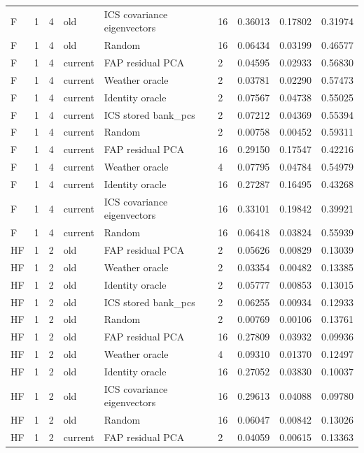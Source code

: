 \begin{tabular}{lllllllll}
F & 1 & 4 & old & ICS covariance eigenvectors & 16 & 0.36013 & 0.17802 & 0.31974 \\
F & 1 & 4 & old & Random & 16 & 0.06434 & 0.03199 & 0.46577 \\
F & 1 & 4 & current & FAP residual PCA & 2 & 0.04595 & 0.02933 & 0.56830 \\
F & 1 & 4 & current & Weather oracle & 2 & 0.03781 & 0.02290 & 0.57473 \\
F & 1 & 4 & current & Identity oracle & 2 & 0.07567 & 0.04738 & 0.55025 \\
F & 1 & 4 & current & ICS stored bank\_pcs & 2 & 0.07212 & 0.04369 & 0.55394 \\
F & 1 & 4 & current & Random & 2 & 0.00758 & 0.00452 & 0.59311 \\
F & 1 & 4 & current & FAP residual PCA & 16 & 0.29150 & 0.17547 & 0.42216 \\
F & 1 & 4 & current & Weather oracle & 4 & 0.07795 & 0.04784 & 0.54979 \\
F & 1 & 4 & current & Identity oracle & 16 & 0.27287 & 0.16495 & 0.43268 \\
F & 1 & 4 & current & ICS covariance eigenvectors & 16 & 0.33101 & 0.19842 & 0.39921 \\
F & 1 & 4 & current & Random & 16 & 0.06418 & 0.03824 & 0.55939 \\
HF & 1 & 2 & old & FAP residual PCA & 2 & 0.05626 & 0.00829 & 0.13039 \\
HF & 1 & 2 & old & Weather oracle & 2 & 0.03354 & 0.00482 & 0.13385 \\
HF & 1 & 2 & old & Identity oracle & 2 & 0.05777 & 0.00853 & 0.13015 \\
HF & 1 & 2 & old & ICS stored bank\_pcs & 2 & 0.06255 & 0.00934 & 0.12933 \\
HF & 1 & 2 & old & Random & 2 & 0.00769 & 0.00106 & 0.13761 \\
HF & 1 & 2 & old & FAP residual PCA & 16 & 0.27809 & 0.03932 & 0.09936 \\
HF & 1 & 2 & old & Weather oracle & 4 & 0.09310 & 0.01370 & 0.12497 \\
HF & 1 & 2 & old & Identity oracle & 16 & 0.27052 & 0.03830 & 0.10037 \\
HF & 1 & 2 & old & ICS covariance eigenvectors & 16 & 0.29613 & 0.04088 & 0.09780 \\
HF & 1 & 2 & old & Random & 16 & 0.06047 & 0.00842 & 0.13026 \\
HF & 1 & 2 & current & FAP residual PCA & 2 & 0.04059 & 0.00615 & 0.13363 \\

\end{tabular}

